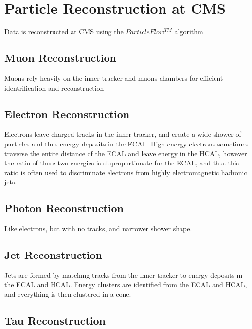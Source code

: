 \chapter{Particle Reconstruction at CMS}
\label{reconstruction_overview}

\par Data is reconstructed at CMS using the $Particle Flow^{TM}$ algorithm

\section{Muon Reconstruction}
\label{muon_reco_overview}

\par Muons rely heavily on the inner tracker and muons chambers for
efficient identrification and reconstruction

\section{Electron Reconstruction}
\label{electron_reco_overview}

\par Electrons leave charged tracks in the inner tracker, and create a
wide shower of particles and thus energy deposits in the ECAL.  High
energy electrons sometimes traverse the entire distance of the ECAL
and leave energy in the HCAL, however the ratio of these two energies
is disproportionate for the ECAL, and thus this ratio is often used to
discriminate electrons from highly electromagnetic hadronic jets.

\section{Photon Reconstruction}
\label{photon_reco_overview}

\par Like electrons, but with no tracks, and narrower shower shape.

\section{Jet Reconstruction}
\label{jet_reco_overview}

\par Jets are formed by matching tracks from the inner tracker to
energy deposits in the ECAL and HCAL.  Energy clusters are identified
from the ECAL and HCAL, and everything is then clustered in a cone.

\section{Tau Reconstruction}
\label{tau_reco_overview}

